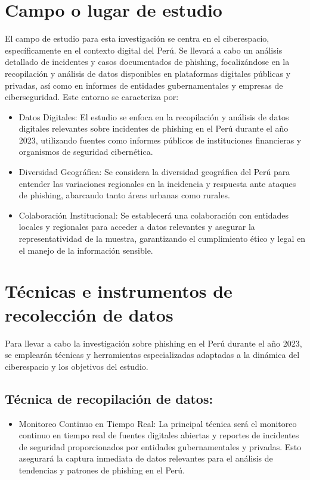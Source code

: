 \section{Campo o lugar de estudio}
El campo de estudio para esta investigación se centra en el ciberespacio, específicamente en el contexto digital del Perú. Se llevará a cabo un análisis detallado de incidentes y casos documentados de phishing, focalizándose en la recopilación y análisis de datos disponibles en plataformas digitales públicas y privadas, así como en informes de entidades gubernamentales y empresas de ciberseguridad. Este entorno se caracteriza por:
\begin{itemize}
    \item Datos Digitales: El estudio se enfoca en la recopilación y análisis de datos digitales relevantes sobre incidentes de phishing en el Perú durante el año 2023, utilizando fuentes como informes públicos de instituciones financieras y organismos de seguridad cibernética.
    \item Diversidad Geográfica: Se considera la diversidad geográfica del Perú para entender las variaciones regionales en la incidencia y respuesta ante ataques de phishing, abarcando tanto áreas urbanas como rurales.
    \item Colaboración Institucional: Se establecerá una colaboración con entidades locales y regionales para acceder a datos relevantes y asegurar la representatividad de la muestra, garantizando el cumplimiento ético y legal en el manejo de la información sensible.
\end{itemize}
\section{Técnicas e instrumentos de recolección de datos}
Para llevar a cabo la investigación sobre phishing en el Perú durante el año 2023, se emplearán técnicas y herramientas especializadas adaptadas a la dinámica del ciberespacio y los objetivos del estudio.
\subsection{Técnica de recopilación de datos:}
\begin{itemize}
    \item Monitoreo Continuo en Tiempo Real: La principal técnica será el monitoreo continuo en tiempo real de fuentes digitales abiertas y reportes de incidentes de seguridad proporcionados por entidades gubernamentales y privadas. Esto asegurará la captura inmediata de datos relevantes para el análisis de tendencias y patrones de phishing en el Perú.
\end{itemize}
